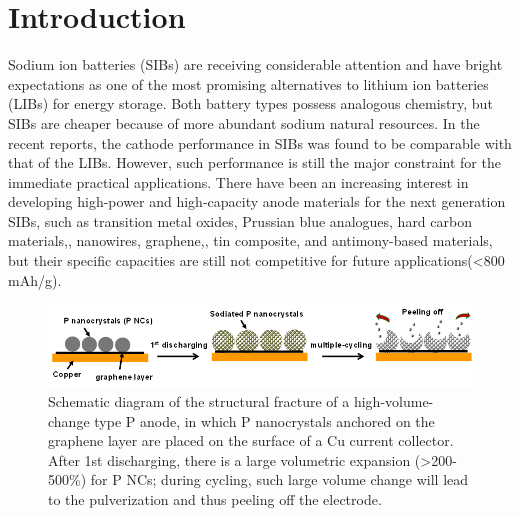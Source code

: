 \section{Introduction}
Sodium ion batteries (SIBs) are receiving considerable attention and have bright expectations as one of the most promising alternatives to lithium ion batteries (LIBs) for energy storage.\cite{Ren2014c,Yang2011c,Liu2014a,Wen2014b,Shen2015b,wang2014e,Wu2014b,Yao2015b,Ni2014b} Both battery types possess analogous chemistry, but SIBs are cheaper because of more abundant sodium natural resources. In the recent reports, the cathode performance in SIBs was found to be comparable with that of the LIBs.\cite{Sun2014b,Barpanda2014b} However, such performance is still the major constraint for the immediate practical applications. There have been an increasing interest in developing high-power and high-capacity anode materials for the next generation SIBs,\cite{Ong2011b,Palomares2012b,Zhu2014b,Yu2014b,Berthelot2011b,Qian2012d,Wang2013g,Komaba2011b,Cao2012b,Wang2013h,Xu2013b,Qian2012e} such as transition metal oxides,\cite{Zhu2014b,Yu2014b,Berthelot2011b} Prussian blue analogues,\cite{Qian2012d,Wang2013g} hard carbon materials,\cite{Komaba2011b}, nanowires,\cite{Cao2012b} graphene,\cite{Wen2014b,Wang2013h}, tin composite, \cite{Xu2013b} and antimony-based materials,\cite{Qian2012e} but their specific capacities are still not competitive for future applications(<800 mAh/g). \\

\begin{figure}  
\includegraphics[width=\textwidth]{figures/figure4_s1}
\caption[Peeling off after cycling]
{Schematic diagram of the structural fracture of a high-volume-change type P anode, in which P nanocrystals anchored on the graphene layer are placed on the surface of a Cu current collector. After 1st discharging, there is a large volumetric expansion (>200-500\%) for P NCs; during cycling, such large volume change will lead to the pulverization and thus peeling off the electrode.
\label{fig:4_s1}}
\end{figure}


